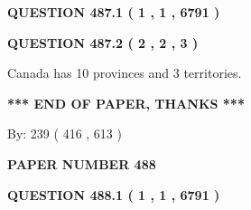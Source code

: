 \documentclass[12pt]{article}
\begin{document}
   
   
   
 \vspace{0.2in}
 
 
 
 
   
   
  
\vspace{0.2in}
  
{\textbf{\Large{QUESTION
487.1 
 ( 1 , 1 , 6791 )
}}}
  
  
  
\vspace{0.2in}
  
{\textbf{\Large{QUESTION
487.2 
 ( 2 , 2 , 3 )
}}}
  
  
 
 
\noindent{}
 
 
Canada has 10  provinces and 3 territories.
 
 
 
 
   
   
 \vspace{0.2in}
 
   
   
   
   
\vspace{1.0in} 
{\textbf{\large{ *** END OF PAPER, THANKS *** }}} 
   
   
\hspace{1.0in} By: 
 239 ( 416 ,  613 )
   
   
   
   
\newpage 
\setcounter{page}{ 
   488001 } 
   
   
   
   
 {\textbf{ \Large{ PAPER NUMBER  488  }}}
   
   
\vspace{0.2in}
   
   
   
   
   
   
 \vspace{0.2in}
 
 
 
 
   
   
  
\vspace{0.2in}
  
{\textbf{\Large{QUESTION
488.1 
 ( 1 , 1 , 6791 )
}}}
  
\end{document}
